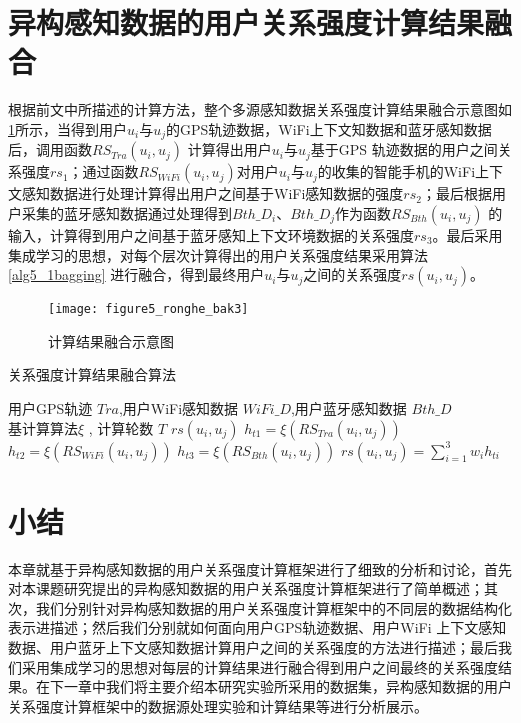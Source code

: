 \section{异构感知数据的用户关系强度计算结果融合}
根据前文中所描述的计算方法，整个多源感知数据关系强度计算结果融合示意图如\ref{fig:ronghe}所示，当得到用户$u_{i}$与$u_{j}$的GPS轨迹数据，WiFi上下文知数据和蓝牙感知数据后，调用函数$RS_{Tra}(u_{i},u_{j})$ 计算得出用户$u_{i}$与$u_{j}$基于GPS 轨迹数据的用户之间关系强度$rs_{1}$；通过函数$RS_{WiFi}(u_{i},u_{j})$对用户$u_{i}$与$u_{j}$的收集的智能手机的WiFi上下文感知数据进行处理计算得出用户之间基于WiFi感知数据的强度$rs_{2}$；最后根据用户采集的蓝牙感知数据通过处理得到$Bth\_D_{i}$、$Bth\_D_{j}$作为函数$RS_{Bth}(u_{i},u_{j})$ 的输入，计算得到用户之间基于蓝牙感知上下文环境数据的关系强度$rs_{3}$。最后采用集成学习的思想，对每个层次计算得出的用户关系强度结果采用算法\ref{alg5_1bagging} 进行融合，得到最终用户$u_{i}$与$u_{j}$之间的关系强度$rs(u_{i},u_{j})$。
\begin{figure}[htb]
\centering
\texttt{[image: figure5\_ronghe\_bak3]}
\caption{计算结果融合示意图}
\label{fig:ronghe}
\end{figure}

\begin{algorithm}[htb]
\wuhao
\caption{关系强度计算结果融合算法}
\label{alg5_1bagging}
\begin{algorithmic}[1] %
				\REQUIRE 用户GPS轨迹 $Tra$,用户WiFi感知数据 $WiFi\_D$,用户蓝牙感知数据 $Bth\_D$ \\ 基计算算法$\xi$ , 计算轮数 $T$
				\ENSURE $rs(u_{i},u_{j})$
				\STATE $h_{t1}=\xi (RS_{Tra}(u_{i},u_{j}))$
                \STATE $h_{t2}=\xi (RS_{WiFi}(u_{i},u_{j}))$
                \STATE $h_{t3}=\xi (RS_{Bth}(u_{i},u_{j}))$
				\ENDWHILE
				\STATE $rs(u_{i},u_{j})=\sum_{i=1}^{3}w_{i}h_{ti}$
\end{algorithmic}
\end{algorithm}

\newpage
\section{小结}
\label{sec:section4-4}
本章就基于异构感知数据的用户关系强度计算框架进行了细致的分析和讨论，首先对本课题研究提出的异构感知数据的用户关系强度计算框架进行了简单概述；其次，我们分别针对异构感知数据的用户关系强度计算框架中的不同层的数据结构化表示进描述；然后我们分别就如何面向用户GPS轨迹数据、用户WiFi 上下文感知数据、用户蓝牙上下文感知数据计算用户之间的关系强度的方法进行描述；最后我们采用集成学习的思想对每层的计算结果进行融合得到用户之间最终的关系强度结果。在下一章中我们将主要介绍本研究实验所采用的数据集，异构感知数据的用户关系强度计算框架中的数据源处理实验和计算结果等进行分析展示。

